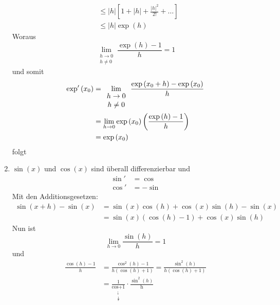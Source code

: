 \begin{enumerate}
\begin{align*}
&\le \left| h \right|\left[ {1 + \left| h \right| + \frac{{{{\left| h \right|}^2}}}{{2!}} +  \ldots } \right]\\
&\le \left| h \right|\exp \left( h \right)
\end{align*}
Woraus
\[\mathop {\lim }\limits_{\begin{array}{*{20}{c}}
{h \to 0}\\
{h\not  = 0}
\end{array}} \frac{{\exp \left( h \right) - 1}}{h} = 1\]
und somit
\begin{align*}
{\mathop{\rm exp'}\nolimits} \left( {{x_0}} \right)&= \mathop {\lim }\limits_{\begin{array}{*{20}{c}}
{h \to 0}\\
{h\not  = 0}
\end{array}} \frac{{\exp \left( {{x_0} + h} \right) - \exp \left( {{x_0}} \right)}}{h}\\
&= \mathop {\lim }\limits_{h \to 0} \exp \left( {{x_0}} \right)\left( {\frac{{\exp \left( h \right) - 1}}{h}} \right)\\
&= \exp \left( {{x_0}} \right)
\end{align*}
folgt
\item $\sin(x)$ und $\cos(x)$ sind überall differenzierbar und
\begin{align*}
\sin'&=\cos\\
\cos'&=-\sin
\end{align*}
Mit den Additionsgesetzen:
\begin{align*}
\sin \left( {x + h} \right) - \sin \left( x \right) &= \sin \left( x \right)\cos \left( h \right) + \cos \left( x \right)\sin \left( h \right) - \sin \left( x \right)\\
& = \sin \left( x \right)\left( {\cos \left( h \right) - 1} \right) + \cos \left( x \right)\sin \left( h \right)
\end{align*}
Nun ist
\[\mathop {\lim }\limits_{h \to 0} \frac{{\sin \left( h \right)}}{h} = 1\]
und
\begin{align*}
\frac{{\cos \left( h \right) - 1}}{h} &= \frac{{{{\cos }^2}\left( h \right) - 1}}{{h\left( {\cos \left( h \right) + 1} \right)}} = \frac{{{{\sin }^2}\left( h \right)}}{{h\left( {\cos \left( h \right) + 1} \right)}}\\
& = \frac{1}{{\mathop {\cos \left( h \right) + 1}\limits_{\begin{array}{*{20}{c}}
 \downarrow \\
{\frac{1}{2}}
\end{array}} }} \cdot \frac{{{{\sin }^2}\left( h \right)}}{{\mathop h\limits_{\begin{array}{*{20}{c}}

\end{array}}}}
\end{align*}
\end{enumerate}

